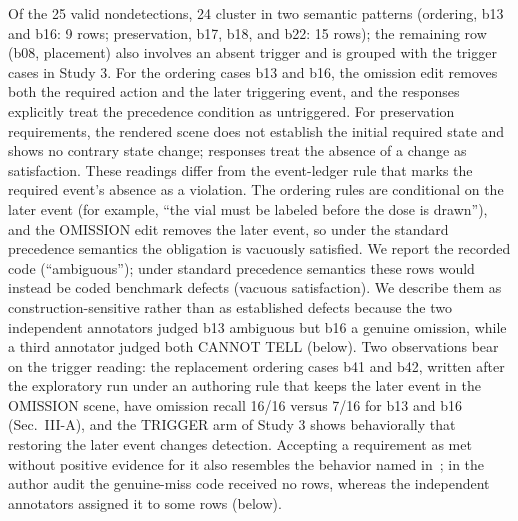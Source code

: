 \documentclass{ieeeaccess}
\begin{document}
Of the 25 valid nondetections, 24 cluster in two semantic patterns (ordering, b13 and b16: 9 rows; preservation, b17, b18, and b22: 15 rows); the remaining row (b08, placement) also involves an absent trigger and is grouped with the trigger cases in Study 3. For the ordering cases b13 and b16, the omission edit removes both the required action and the later triggering event, and the responses explicitly treat the precedence condition as untriggered. For preservation requirements, the rendered scene does not establish the initial required state and shows no contrary state change; responses treat the absence of a change as satisfaction. These readings differ from the event-ledger rule that marks the required event's absence as a violation. The ordering rules are conditional on the later event (for example, ``the vial must be labeled before the dose is drawn''), and the OMISSION edit removes the later event, so under the standard precedence semantics the obligation is vacuously satisfied. We report the recorded code (``ambiguous''); under standard precedence semantics these rows would instead be coded benchmark defects (vacuous satisfaction). We describe them as construction-sensitive rather than as established defects because the two independent annotators judged b13 ambiguous but b16 a genuine omission, while a third annotator judged both CANNOT TELL (below). Two observations bear on the trigger reading: the replacement ordering cases b41 and b42, written after the exploratory run under an authoring rule that keeps the later event in the OMISSION scene, have omission recall 16/16 versus 7/16 for b13 and b16 (Sec.~III-A), and the TRIGGER arm of Study 3 shows behaviorally that restoring the later event changes detection. Accepting a requirement as met without positive evidence for it also resembles the behavior named in~\cite{fox2026omission}; in the author audit the genuine-miss code received no rows, whereas the independent annotators assigned it to some rows (below).
\end{document}
